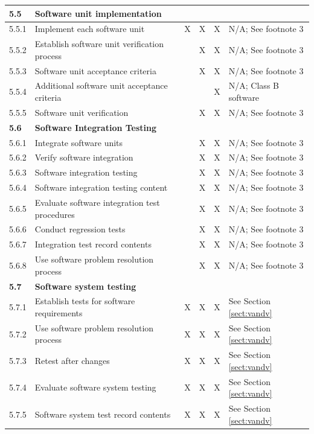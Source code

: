 \documentclass[]{article}
\begin{document}
\begin{center}
\begin{longtable}{ |p{1.3cm}| p{5.5cm}| p{0.7cm}| p{0.7cm}| p{0.7cm}| p{3.5cm}| }
	
	\rowcolor{blue!25} \textbf{5.5} & \textbf{Software unit implementation} &  &  &  &  \\ \hline
	5.5.1 & Implement each software unit & X & X & X & N/A; See footnote 3 \\ \hline
	5.5.2 & Establish software unit verification process &  & X & X & N/A; See footnote 3 \\ \hline
	5.5.3 & Software unit acceptance criteria &  & X & X & N/A; See footnote 3 \\ \hline
	5.5.4 & Additional software unit  acceptance criteria &  &  & X &  N/A; Class B software \\ \hline
	5.5.5 & Software unit verification &  & X & X & N/A; See footnote 3 \\ \hline
	
	
	\rowcolor{blue!25} \textbf{5.6} & \textbf{Software Integration Testing}  &  &  &  &  \\ \hline
	5.6.1 & Integrate software units  &  & X & X & N/A; See footnote 3 \\ \hline
	5.6.2 & Verify software integration  &  & X & X & N/A; See footnote 3 \\ \hline
	5.6.3 & Software integration testing &  & X & X & N/A; See footnote 3 \\ \hline
	5.6.4 & Software integration testing content &  & X & X & N/A; See footnote 3 \\ \hline
	5.6.5 & Evaluate software integration test procedures &  & X & X & N/A; See footnote 3 \\ \hline
	5.6.6 & Conduct regression tests &  & X & X &N/A; See footnote 3  \\ \hline
	5.6.7 & Integration test record contents  &  & X & X &N/A; See footnote 3  \\ \hline
	5.6.8 & Use software problem resolution process &  & X & X &N/A; See footnote 3  \\ \hline
	
	
	\rowcolor{blue!25} \textbf{5.7} & \textbf{Software system testing} &  &  &  &  \\ \hline
	5.7.1 & Establish tests for software requirements  & X & X & X & See Section \ref{sect:vandv} \\ \hline
	5.7.2 & Use software problem resolution process  & X & X & X & See Section \ref{sect:vandv} \\ \hline
	5.7.3 & Retest after changes  & X & X & X & See Section \ref{sect:vandv} \\ \hline
	5.7.4 & Evaluate software system testing & X & X & X & See Section \ref{sect:vandv} \\ \hline
	5.7.5 & Software system test record contents  & X & X & X & See Section \ref{sect:vandv} \\ \hline
	

\end{longtable}
\end{center}
\end{document}
